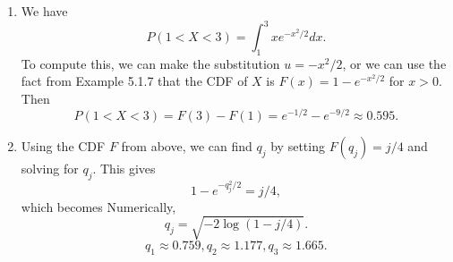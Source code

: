 

\setcounter{theorem}{0}
\begin{exercise}[BH.5.1]
\begin{solution}
    \begin{enumerate}
	    \item We have
	    $$
	    P(1<X<3)=\int_1^3 x e^{-x^2 / 2} d x .
	    $$
	    To compute this, we can make the substitution $u=-x^2 / 2$, or we can use the fact from Example 5.1.7 that the CDF of $X$ is $F(x)=1-e^{-x^2 / 2}$ for $x>0$. Then
	    $$
	    P(1<X<3)=F(3)-F(1)=e^{-1 / 2}-e^{-9 / 2} \approx 0.595 .
	    $$
		\item   Using the CDF $F$ from above, we can find $q_j$ by setting $F\left(q_j\right)=j / 4$ and solving for $q_j$. This gives
		 $$
		 1-e^{-q_j^2 / 2}=j / 4,
		 $$
		 which becomes
		 Numerically,
		 $$
		 q_j=\sqrt{-2 \log (1-j / 4)} .
		 $$
		 $$
		 q_1 \approx 0.759, q_2 \approx 1.177, q_3 \approx 1.665 .
		 $$
	\end{enumerate}
\end{solution}
\end{exercise}


